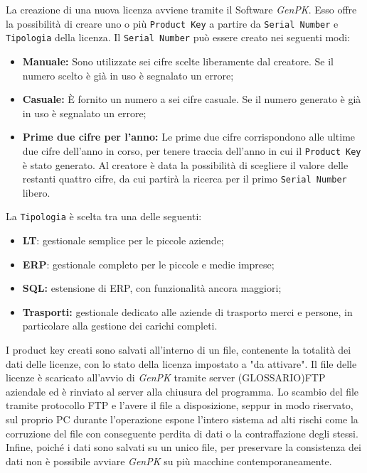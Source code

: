 La creazione di una nuova licenza avviene tramite il Software \textit{GenPK}. Esso offre la possibilità di creare uno o più \texttt{Product Key} a partire da \texttt{Serial Number} e \texttt{Tipologia} della licenza.
Il \texttt{Serial Number} può essere creato nei seguenti modi:
\begin{itemize}
\item \textbf{Manuale:} Sono utilizzate sei cifre scelte liberamente dal creatore. Se il numero scelto è già in uso è segnalato un errore;
\item \textbf{Casuale:} È fornito un numero a sei cifre casuale. Se il numero generato è già in uso è segnalato un errore; 
\item \textbf{Prime due cifre per l'anno:} Le prime due cifre corrispondono alle ultime due cifre dell'anno in corso, per tenere traccia dell'anno in cui il \texttt{Product Key} è stato generato. Al creatore è data la possibilità di scegliere il valore delle restanti quattro cifre, da cui partirà la ricerca per il primo \texttt{Serial Number} libero.
\end{itemize}
La \texttt{Tipologia} è scelta tra una delle seguenti:
\begin{itemize}
\item \textbf{LT}: gestionale semplice per le piccole aziende;
\item \textbf{ERP}: gestionale completo per le piccole e medie imprese;
\item \textbf{SQL:} estensione di ERP, con funzionalità ancora maggiori;
\item \textbf{Trasporti:} gestionale dedicato alle aziende di trasporto merci e persone, in particolare alla gestione dei carichi completi.
\end{itemize}

I product key creati sono salvati all'interno di un file, contenente la totalità dei dati delle licenze, con lo stato della licenza impostato a "da attivare". Il file delle licenze è scaricato all'avvio di \textit{GenPK} tramite server (GLOSSARIO)FTP aziendale ed è rinviato al server alla chiusura del programma. Lo scambio del file tramite protocollo FTP e l'avere il file a disposizione, seppur in modo riservato, sul proprio PC durante l'operazione espone l'intero sistema ad alti rischi come la corruzione del file con conseguente perdita di dati o la contraffazione degli stessi.\\
Infine, poiché i dati sono salvati su un unico file, per preservare la consistenza dei dati non è possibile avviare \textit{GenPK} su più macchine contemporaneamente.

